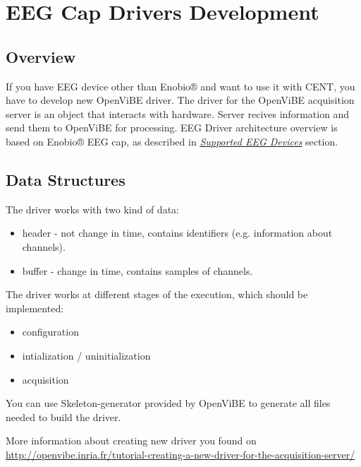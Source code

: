 \documentclass[letterpaper,10pt,english]{sphinxmanual}
\begin{document}
\section{\textbf{EEG Cap Drivers Development}}
\label{index:eeg-cap-drivers-development}\label{index:id8}

\subsection{\textbf{Overview}}
\label{index:overview}
If you have EEG device other than Enobio® and want to use it with CENT, you have to develop new OpenViBE driver. The driver for the OpenViBE acquisition server is an object that interacts with hardware. Server recives information and send them to OpenViBE for processing.
EEG Driver architecture overview is based on Enobio® EEG cap, as described in {\hyperref[index:supported-eeg-devices]{\emph{Supported EEG Devices}}} section.


\subsection{\textbf{Data Structures}}
\label{index:data-structures}
The driver works with two kind of data:
\begin{itemize}
\item {} 
header - not change in time, contains identifiers (e.g. information about channels).

\item {} 
buffer - change in time, contains samples of channels.

\end{itemize}

The driver works at different stages of the execution, which should be implemented:
\begin{itemize}
\item {} 
configuration

\item {} 
intialization / uninitialization

\item {} 
acquisition

\end{itemize}

You can use Skeleton-generator provided by OpenViBE to generate all files needed to build the driver.

More information about creating new driver you found on \href{http://openvibe.inria.fr/tutorial-creating-a-new-driver-for-the-acquisition-server/}{http://openvibe.inria.fr/tutorial-creating-a-new-driver-for-the-acquisition-server/}
\end{document}
